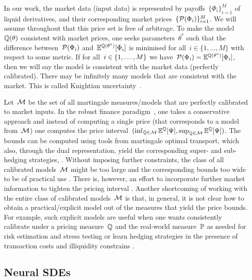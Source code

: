 In our work, the market data (input data) is represented by payoffs~$\{\Phi_i\}_{i=1}^M$ of liquid derivatives, and their corresponding market prices~$\{\mathcal{P}(\Phi_i)\}_{i=1}^{M}$.
We will assume throughout that this price set is free of arbitrage. 
To make the model~$\mathbb{Q}(\theta)$ consistent with market prices, one seeks parameters~$\theta^{*}$ such that 
the difference between~$\mathcal{P}(\Phi_i)$ and~$\mathbb{E}^{\mathbb{Q}(\theta^*)}[\Phi_i]$ is minimised for all~$i\in\{1,\ldots,M\}$ with respect to some metric.
If for all~$i\in\nobreak\{1,\ldots, M\}$  we have~$\mathcal{P}(\Phi_i) = \mathbb{E}^{\mathbb{Q}(\theta^*)}[\Phi_i]$, then we will say the model is consistent with the market data (perfectly calibrated).
There may be infinitely many models that are consistent with the market.
This is called Knightian uncertainty~\cite{Watkins1922KnightsProfit, Cohen2018DataApproach}. 



Let~$\mathcal{M}$  be the set of all martingale measures/models that are perfectly calibrated to market inputs. 
In the robust finance paradigm~\cite{Hobson1998RobustOption, Cox2011RobustOptions}, one takes a conservative approach and instead of computing a single price (that corresponds to a model from~$\mathcal{M}$) one computes the price interval~$(\inf_{\mathbb{Q} \in \mathcal{M}}\mathbb{E}^{\mathbb{Q} }[\Psi],\sup_{\mathbb{Q} \in \mathcal{M}}\mathbb{E}^{\mathbb{Q} }[\Psi])$. The bounds can be computed using tools from martingale optimal transport, which also, through the dual representation, yield the corresponding super- and sub-hedging strategies, \cite{Beiglbock2013Model-independentApproach}. Without imposing further constraints, the class of all calibrated models~$\mathcal{M}$ might be too large and the corresponding bounds too wide to be of practical use \cite{Eckstein2019RobustNumerics}. There is, however, an effort to incorporate further market information to tighten the pricing interval \cite{Nadtochiy2017RobustSkew}. Another shortcoming of working with the entire class of calibrated models~$\mathcal{M}$ is that, in general, it is not clear how to obtain a practical/explicit model out of the measures that yield the price bounds. For example, such explicit models are useful when one wants consistently calibrate under a pricing measure~$\mathbb{Q}$ and the real-world measure~$\mathbb{P}$ as needed for risk estimation and stress testing \cite{Broadie2011EfficientSimulation, Pelsser2016TheModeling} or learn hedging strategies in the presence of transaction costs and illiquidity constrains \cite{Buehler2019DeepHedging}.

\subsection{Neural SDEs}\label{sec nsdes}

